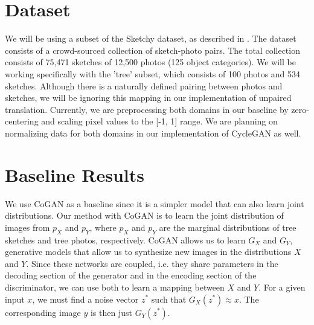 \documentclass[10pt,twocolumn,letterpaper]{article}
\begin{document}
\section{Dataset}
We will be using a subset of the Sketchy dataset, as described in \cite{sangkloy2016sketchy}. The dataset consists of a crowd-sourced collection of sketch-photo pairs. The total collection consists of 75,471 sketches of 12,500 photos (125 object categories). We will be working specifically with the 'tree' subset, which consists of 100 photos and 534 sketches. Although there is a naturally defined pairing between photos and sketches, we will be ignoring this mapping in our implementation of unpaired translation. Currently, we are preprocessing both domains in our baseline by zero-centering and scaling pixel values to the [-1, 1] range. We are planning on normalizing data for both domains in our implementation of CycleGAN as well.

\section{Baseline Results}
We use CoGAN \cite{cogan} as a baseline since it is a simpler model that can also learn joint distributions.
Our method with CoGAN is to learn the joint distribution of images from $p_X$ and $p_Y$, where $p_X$ and $p_Y$ are the marginal distributions of tree sketches and tree photos, respectively.
CoGAN allows us to learn $G_X$ and $G_Y$, generative models that allow us to synthesize new images in the distributions $X$ and $Y$.
Since these networks are coupled, i.e. they share parameters in the decoding section of the generator and in the encoding section of the discriminator, we can use both to learn a mapping between $X$ and $Y$.
For a given input $x$, we must find a noise vector $z^*$ such that $G_X(z^*) \approx x$.
The corresponding image $y$ is then just $G_Y(z^*)$.

\end{document}
